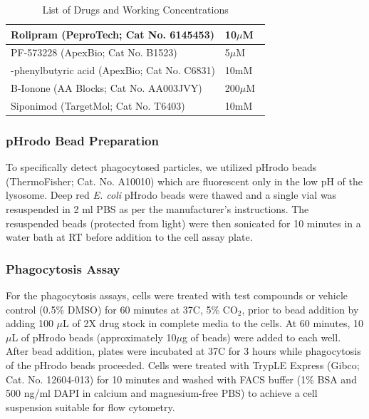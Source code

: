 \documentclass{article}
\begin{document}
\begin{table}[htbp]
\begin{tabularx}{\columnwidth}{| >{\raggedright\arraybackslash}X | l |}
\hline
Rolipram (PeproTech; Cat No. 6145453) & 10$\mu$M \\
\hline
PF-573228 (ApexBio; Cat No. B1523) & 5$\mu$M~\cite{aulakh_inhibiting_2018} \\
\hline
4-phenylbutyric acid (ApexBio; Cat No. C6831) & 10mM~\cite{jiang_4-phenylbutyric_2021} \\
\hline
B-Ionone (AA Blocks; Cat No. AA003JVY) & 200$\mu$M~\cite{kang_-ionone_2013} \\
\hline
Siponimod (TargetMol; Cat No. T6403) & 10mM~\cite{sartawi_bone_2020} \\
\hline
\end{tabularx}

\caption{List of Drugs and Working Concentrations}
\end{table}





\subsubsection{pHrodo Bead Preparation}

To specifically detect phagocytosed particles, we utilized pHrodo beads (ThermoFisher; Cat. No. A10010) which are fluorescent only in the low pH of the lysosome. Deep red \emph{E. coli} pHrodo beads were thawed and a single vial was resuspended in 2 ml PBS as per the manufacturer's instructions. The resuspended beads (protected from light) were then sonicated for 10 minutes in a water bath at RT before addition to the cell assay plate. 

\subsubsection{Phagocytosis Assay}

For the phagocytosis assays, cells were treated with test compounds or vehicle control (0.5\% DMSO) for 60 minutes at 37\textdegree C, 5\% CO$_{2}$, prior to bead addition by adding 100 $\mu$L of 2X drug stock in complete media to the cells. At 60 minutes, 10 $\mu$L of pHrodo beads (approximately 10$\mu$g of beads) were added to each well. After bead addition, plates were incubated at 37\textdegree C for 3 hours while phagocytosis of the pHrodo beads proceeded. Cells were treated with TrypLE Express (Gibco; Cat. No. 12604-013) for 10 minutes and washed with FACS buffer (1\% BSA and 500 ng/ml DAPI in calcium and magnesium-free PBS) to achieve a cell suspension suitable for flow cytometry.
\end{document}
